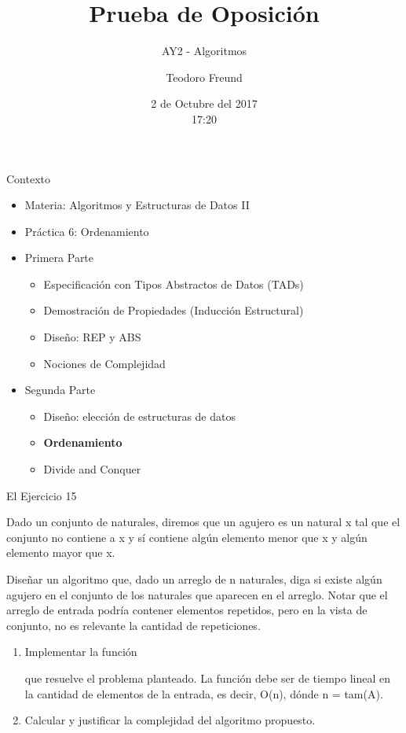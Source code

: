 \documentclass[pdf
]{beamer}
\title{Prueba de Oposición}
\subtitle{AY2 - Algoritmos}
\author{\large{Teodoro Freund}}
\date{2 de Octubre del 2017 \\ \footnotesize{17:20}} %
\begin{document}
\begin{frame}
\titlepage
\end{frame}

\begin{frame}{Contexto}
\begin{itemize}
\item Materia: Algoritmos y Estructuras de Datos II
\pause
\item Práctica 6: Ordenamiento
\pause
\item Primera Parte
\begin{itemize}
\item Especificación con Tipos Abstractos de Datos (TADs)
\item Demostración de Propiedades (Inducción Estructural)
\item Diseño: REP y ABS
\item Nociones de Complejidad
\end{itemize}

\item Segunda Parte
\begin{itemize}

\item Diseño: elección de estructuras de datos
\pause
\item \textbf{Ordenamiento}
\pause
\item Divide and Conquer
\end{itemize}
\end{itemize}

\end{frame}

\begin{frame}{El Ejercicio 15}

Dado un conjunto de naturales, diremos que un agujero es un natural x tal que el conjunto no contiene a x y sí contiene algún elemento menor que x y algún elemento mayor que x.

\vspace{10pt}

\pause
Diseñar un algoritmo que, dado un arreglo de n naturales, diga si existe algún agujero en el conjunto de los naturales que aparecen en el arreglo. Notar que el arreglo de entrada podría contener elementos repetidos, pero en la vista de conjunto, no es relevante la cantidad de repeticiones.

\vspace{10pt}

\pause
\begin{enumerate}
\item {Implementar la función 

que resuelve el problema planteado. La función debe ser de tiempo lineal en la cantidad de elementos de la entrada, es decir, O(n), dónde n = tam(A).}
\pause
\item {Calcular y justificar la complejidad del algoritmo propuesto.}
\end{enumerate}



\end{frame}
\end{document}
